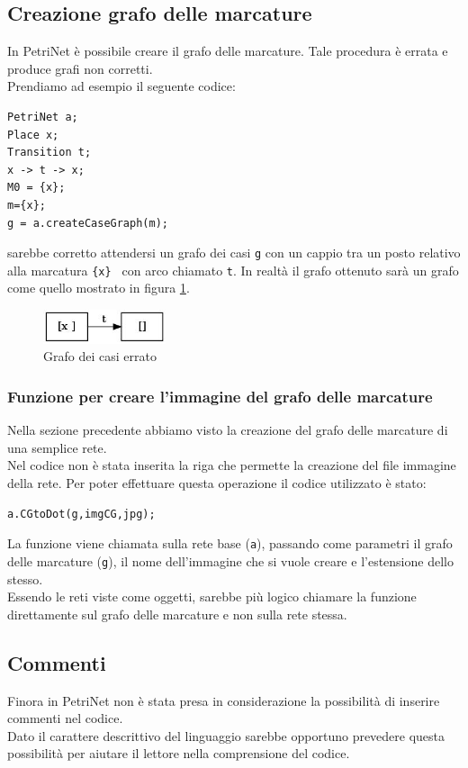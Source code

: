 \documentclass[italian,12pt]{book}
\begin{document}
\subsection{Creazione grafo delle marcature}
In PetriNet è possibile creare il grafo delle marcature. Tale procedura è errata e produce 
grafi non corretti. \\
Prendiamo ad esempio il seguente codice:
\begin{verbatim}PetriNet a;
Place x;
Transition t;
x -> t -> x;
M0 = {x};
m={x};
g = a.createCaseGraph(m);
\end{verbatim}
sarebbe corretto attendersi un grafo dei casi {\tt g} con un cappio tra un posto relativo alla marcatura 
{\tt \{x\} } con arco chiamato {\tt t}. In realtà il grafo ottenuto sarà un grafo come quello mostrato
in figura \ref{fig:err_grafo_casi_1}.
\begin{figure}[htb]
\centerline{\includegraphics[height=1cm]{img/CG1.jpg}}
\caption{Grafo dei casi errato}\label{fig:err_grafo_casi_1}
\end{figure}

\subsubsection{Funzione per creare l'immagine del grafo delle marcature}
Nella sezione precedente abbiamo visto la creazione del grafo delle marcature di una semplice rete. \\
Nel codice non è stata inserita la riga che permette la creazione del file immagine della rete. Per poter
effettuare questa operazione il codice utilizzato è stato: \begin{verbatim}a.CGtoDot(g,imgCG,jpg);\end{verbatim}
La funzione viene chiamata sulla rete base ({\tt a}), passando come parametri il grafo delle marcature ({\tt g}), 
il nome dell'immagine che si vuole creare e l'estensione dello stesso.\\
Essendo le reti viste come oggetti, sarebbe più logico chiamare la funzione direttamente sul grafo delle 
marcature e non sulla rete stessa.

\subsection{Commenti}
Finora in PetriNet non è stata presa in considerazione la possibilità di inserire commenti
nel codice.\\
Dato il carattere descrittivo del linguaggio sarebbe opportuno prevedere questa possibilità
per aiutare il lettore nella comprensione del codice.
\end{document}
